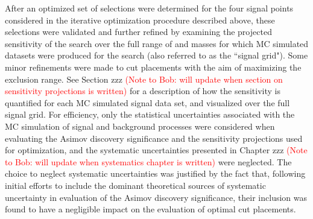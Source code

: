 After an optimized set of selections were determined for the four signal points considered in the iterative optimization procedure described above, these selections were validated and further refined by examining the projected sensitivity of the search over the full range of \mZp and \ms masses for which MC simulated datasets were produced for the search (also referred to as the ``signal grid"). Some minor refinements were made to cut placements with the aim of maximizing the exclusion range. See Section zzz \textcolor{red}{(Note to Bob: will update when section on sensitivity projections is written)} for a description of how the sensitivity is quantified for each MC simulated signal data set, and visualized over the full signal grid. For efficiency, only the statistical uncertainties associated with the MC simulation of signal and background processes were considered when evaluating the Asimov discovery significance and the sensitivity projections used for optimization, and the systematic uncertainties presented in Chapter zzz \textcolor{red}{(Note to Bob: will update when systematics chapter is written)} were neglected. The choice to neglect systematic uncertainties was justified by the fact that, following initial efforts to include the dominant theoretical sources of systematic uncertainty in evaluation of the Asimov discovery significance, their inclusion was found to have a negligible impact on the evaluation of optimal cut placements.

